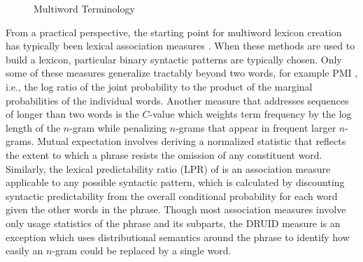 \documentclass[11pt,letterpaper]{article}
\begin{document}
\begin{figure}[!t]
\caption{Multiword Terminology}
\label{fig:terminology}
\end{figure}



From a practical perspective, the starting point for multiword lexicon creation has typically been lexical association measures \cite{Church90,Dunning93,Schone01,Evert04,Pecina10,DeAraujo11,Kulkarni11,Ramisch14}. When these methods are used to build a lexicon, particular binary syntactic patterns are typically chosen. Only some of these measures generalize tractably beyond two words, for example PMI \cite{Church90}, i.e., the log ratio of the joint probability to the product of the marginal probabilities of the individual words. Another measure that addresses sequences of longer than two words is the $C$-value \cite{Frantzi00} which weights term frequency by the log length of the $n$-gram while penalizing $n$-grams that appear in frequent larger $n$-grams. Mutual expectation \cite{Dias99} involves deriving a normalized statistic that reflects the extent to which a phrase resists the omission of any constituent word. Similarly, the lexical predictability ratio (LPR) of  is an association measure applicable to any possible syntactic pattern, which is calculated by discounting syntactic predictability from the overall conditional probability for each word given the other words in the phrase. Though most association measures involve only usage statistics of the phrase and its subparts, the DRUID measure \cite{Riedl15} is an exception which uses distributional semantics around the phrase to identify how easily an $n$-gram could be replaced by a single word.
\end{document}
